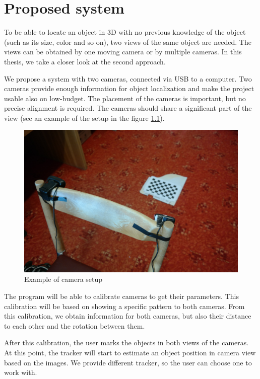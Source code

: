 \chapter{Proposed system}

To be able to locate an object in 3D with no previous knowledge of the object (such
as its size, color and so on), two views of the same object are needed. The
views can be obtained by one moving camera or by multiple cameras. In this
thesis, we take a closer look at the second approach.

We propose a system with two cameras, connected via USB to a computer.
Two cameras provide enough information for object localization and make the
project usable also on low-budget. The placement of the cameras is important,
but no precise alignment is required. The cameras should share a significant part
of the view (see an example of the setup in the figure \ref{fig:camera-setup}).

\begin{figure}
	\includegraphics[width=\linewidth]{img/camera-positions.jpg}
	\caption{Example of camera setup}
	\label{fig:camera-setup}
\end{figure}

The program will be able to calibrate cameras to get their parameters. This
calibration will be based on showing a specific pattern to both cameras. From
this calibration, we obtain information for both cameras, but also their
distance to each other and the rotation between them.

After this calibration, the user marks the objects in both views of the
cameras. At this point, the tracker will start to estimate an object position
in camera view based on the images. We provide different tracker, so the user
can choose one to work with.

